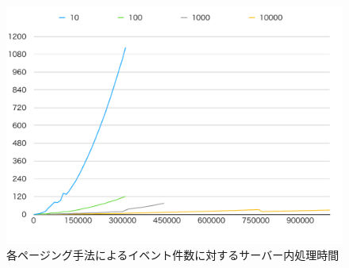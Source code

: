 \documentclass[../../../../../main]{subfiles}
\begin{document}
    \begin{figure}[H]
        \centering
        \includegraphics[width=12cm]{graph}
        \caption{各ページング手法によるイベント件数に対するサーバー内処理時間}
        \label{fig:each-paging-server-time-app_1_1024-db_1_1024}
    \end{figure}
\end{document}
